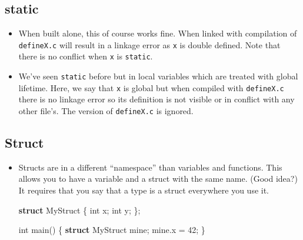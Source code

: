 \documentclass[]{article}
\newenvironment{Shaded}{}{}
\newcommand{\KeywordTok}[1]{\textcolor[rgb]{0.00,0.44,0.13}{\textbf{#1}}}
\newcommand{\DataTypeTok}[1]{\textcolor[rgb]{0.56,0.13,0.00}{#1}}
\newcommand{\DecValTok}[1]{\textcolor[rgb]{0.25,0.63,0.44}{#1}}
\newcommand{\SpecialCharTok}[1]{\textcolor[rgb]{0.25,0.44,0.63}{#1}}
\newcommand{\StringTok}[1]{\textcolor[rgb]{0.25,0.44,0.63}{#1}}
\newcommand{\ImportTok}[1]{#1}
\newcommand{\CommentTok}[1]{\textcolor[rgb]{0.38,0.63,0.69}{\textit{#1}}}
\newcommand{\PreprocessorTok}[1]{\textcolor[rgb]{0.74,0.48,0.00}{#1}}
\newcommand{\NormalTok}[1]{#1}
\begin{document}
\subsection{\texorpdfstring{\textbf{static}}{static}}\label{header-n98}

\begin{itemize}
\item
  When built alone, this of course works fine. When linked with
  compilation of \texttt{defineX.c} will result in a linkage error as
  \texttt{x} is double defined. Note that there is no conflict when
  \texttt{x} is \texttt{static}.

\begin{Shaded}
\end{Shaded}
\item
  We've seen \texttt{static} before but in local variables which are
  treated with global lifetime. Here, we say that \texttt{x} is global
  but when compiled with \texttt{defineX.c} there is no linkage error so
  its definition is not visible or in conflict with any other file's.
  The version of \texttt{defineX.c} is ignored.
\end{itemize}

\subsection{\texorpdfstring{\textbf{Struct}}{Struct}}\label{header-n106}

\begin{itemize}
\item
  Structs are in a different ``namespace'' than variables and functions.
  This allows you to have a variable and a struct with the same name.
  (Good idea?) It requires that you say that a type is a struct
  everywhere you use it.

\begin{Shaded}
\begin{Highlighting}[]
\KeywordTok{struct}\NormalTok{ MyStruct \{}
    \DataTypeTok{int}\NormalTok{ x;}
    \DataTypeTok{int}\NormalTok{ y;}
\NormalTok{\};}

\DataTypeTok{int}\NormalTok{ main() \{}
    \KeywordTok{struct}\NormalTok{ MyStruct mine;}
\NormalTok{    mine.x = }\DecValTok{42}\NormalTok{;}
\NormalTok{\}}
\end{Highlighting}
\end{Shaded}
\end{itemize}
\end{document}
